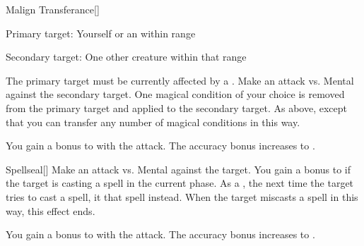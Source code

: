 \lowercase{\hypertarget{spell:Malign Transferance}{}}\label{spell:Malign Transferance}
\begin{freeability}[Rank 3]{\hypertarget{spell:Malign Transferance}{Malign Transferance}}[]

Primary target: Yourself or an  within \rngmed range
\par\noindent
Secondary target: One other creature within that range

The primary target must be currently affected by a  .
Make an attack vs. Mental against the secondary target.
\hit One magical condition of your choice is removed from the primary target and applied to the secondary target.
\crit As above, except that you can transfer any number of magical conditions in this way.

\rankline
{} You gain a  bonus to  with the attack.
 The accuracy bonus increases to .
\end{freeability}
\vspace{0.25em}



\lowercase{\hypertarget{spell:Spellseal}{}}\label{spell:Spellseal}
\begin{freeability}[Rank 3]{\hypertarget{spell:Spellseal}{Spellseal}}[]
Make an attack vs. Mental against the target.
You gain a  bonus to  if the target is casting a spell in the current phase.
\hit As a , the next time the target tries to cast a spell, it  that spell instead.
When the target miscasts a spell in this way, this effect ends.

\rankline
{} You gain a  bonus to  with the attack.
 The accuracy bonus increases to .
\end{freeability}
\vspace{0.25em}



